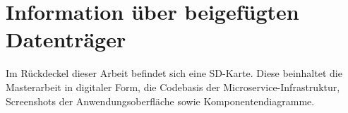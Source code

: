 \chapter{Information über beigefügten Datenträger}
\label{chap:InformationUeberBeigefuegtenDatentraeger}
Im Rückdeckel dieser Arbeit befindet sich eine SD-Karte. Diese beinhaltet
die Masterarbeit in digitaler Form, die Codebasis der Microservice-Infrastruktur,
Screenshots der Anwendungsoberfläche sowie Komponentendiagramme.
